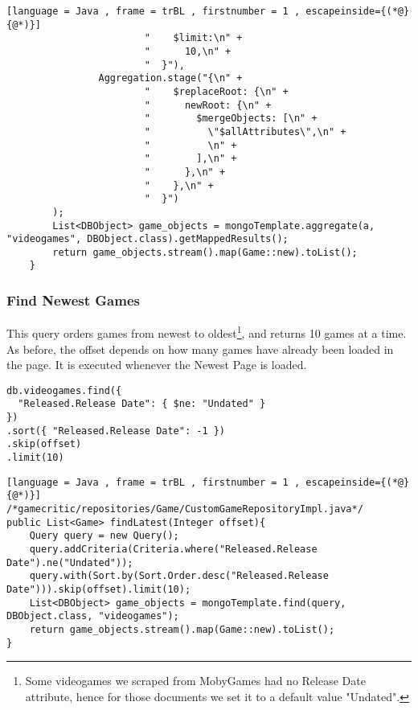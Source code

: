 \begin{lstlisting}[language = Java , frame = trBL , firstnumber = 1 , escapeinside={(*@}{@*)}]
                        "    $limit:\n" +
                        "      10,\n" +
                        "  }"),
                Aggregation.stage("{\n" +
                        "    $replaceRoot: {\n" +
                        "      newRoot: {\n" +
                        "        $mergeObjects: [\n" +
                        "          \"$allAttributes\",\n" +
                        "          \n" +
                        "        ],\n" +
                        "      },\n" +
                        "    },\n" +
                        "  }")
        );
        List<DBObject> game_objects = mongoTemplate.aggregate(a, "videogames", DBObject.class).getMappedResults();
        return game_objects.stream().map(Game::new).toList();
    }
\end{lstlisting}
\subsubsection{Find Newest Games}
This query orders games from newest to oldest\footnote{Some videogames we scraped from MobyGames had no Release Date attribute, hence for those documents we set it to a default value "Undated".}, and returns 10 games at a time. As before, the offset depends on how many games have already been loaded in the page. It is executed whenever the Newest Page is loaded.
\begin{Verbatim}[fontsize=\footnotesize]
db.videogames.find({
  "Released.Release Date": { $ne: "Undated" }
})
.sort({ "Released.Release Date": -1 })
.skip(offset)
.limit(10)
\end{Verbatim}
\begin{lstlisting}[language = Java , frame = trBL , firstnumber = 1 , escapeinside={(*@}{@*)}]
/*gamecritic/repositories/Game/CustomGameRepositoryImpl.java*/
public List<Game> findLatest(Integer offset){
    Query query = new Query();
    query.addCriteria(Criteria.where("Released.Release Date").ne("Undated"));
    query.with(Sort.by(Sort.Order.desc("Released.Release Date"))).skip(offset).limit(10);
    List<DBObject> game_objects = mongoTemplate.find(query, DBObject.class, "videogames");
    return game_objects.stream().map(Game::new).toList();
}
\end{lstlisting}
